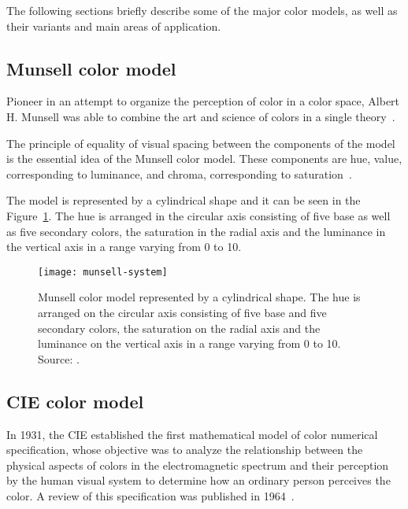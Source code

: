 The following sections briefly describe some of the major color models, as well as their variants and main areas of application.

\subsection{Munsell color model}
\label{sec:modelo_cores_munsell}

Pioneer in an attempt to organize the perception of color in a color space, Albert H. Munsell was able to combine the art and science of colors in a single theory~\citep{konstantinos:00}.

The principle of equality of visual spacing between the components of the model is the essential idea of the Munsell color model. These components are hue, value, corresponding to luminance, and chroma, corresponding to saturation~\citep{konstantinos:00}.

The model is represented by a cylindrical shape and it can be seen in the Figure~\ref{fig:munsell-system}. The hue is arranged in the circular axis consisting of five base as well as five secondary colors, the saturation in the radial axis and the luminance in the vertical axis in a range varying from 0 to 10.

\begin{figure}[!ht]
  \centering
  \texttt{[image: munsell-system]}
  \caption[Munsell color model.]{Munsell color model represented by a cylindrical shape. The hue is arranged on the circular axis consisting of five base and five secondary colors, the saturation on the radial axis and the luminance on the vertical axis in a range varying from 0 to 10. Source: \citet{rus:07}.}
  \label{fig:munsell-system} 
\end{figure}

\subsection{CIE color model}
\label{sec:modelo_cores_cie}

In 1931, the CIE established the first mathematical model of color numerical specification, whose objective was to analyze the relationship between the physical aspects of colors in the electromagnetic spectrum and their perception by the human visual system to determine how an ordinary person perceives the color. A review of this specification was published in 1964~\citep{gonzalez:02}.

